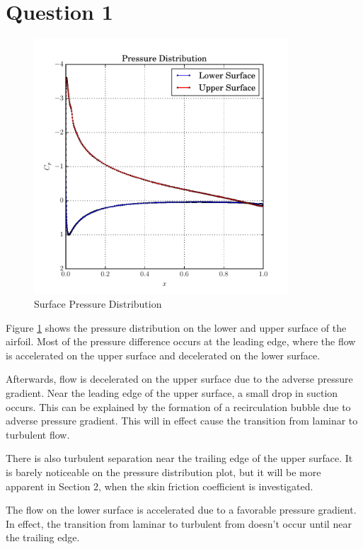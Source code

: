 \documentclass[letterpaper,12pt,]{article}
\begin{document}


\section*{Question 1}

\begin{figure}[!ht]
    \centering
    \includegraphics[width = 0.85\textwidth]{./Figures/q1.pdf}
    \caption {Surface Pressure Distribution}
    \label{fig:q1}
\end{figure}

Figure \ref{fig:q1} shows the pressure distribution on the lower and upper surface of the airfoil.
Most of the pressure difference occurs at the leading edge, where the flow is accelerated on the upper surface and decelerated on the lower surface.

Afterwards, flow is decelerated on the upper surface due to the adverse pressure gradient.
Near the leading edge of the upper surface, a small drop in suction occurs.
This can be explained by the formation of a recirculation bubble due to adverse pressure gradient.
This will in effect cause the transition from laminar to turbulent flow.

There is also turbulent separation near the trailing edge of the upper surface.
It is barely noticeable on the pressure distribution plot, but it will be more apparent in Section 2, when the skin friction coefficient is investigated.

The flow on the lower surface is accelerated due to a favorable pressure gradient. In effect, the transition from laminar to turbulent from doesn't occur until near the trailing edge.
\end{document}

